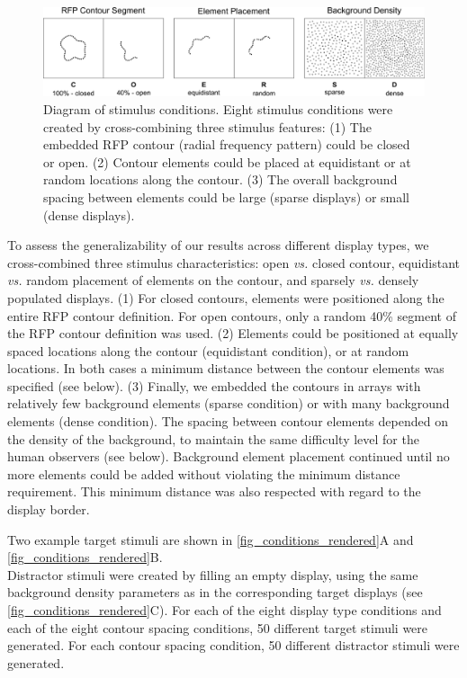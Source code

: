 \documentclass[12pt]{article}
\begin{document}
\begin{figure}[ht]
\includegraphics{Figures/FIG_conditions.png}
\caption{Diagram of stimulus conditions. Eight stimulus conditions were created by cross-combining three stimulus features: (1) The embedded RFP contour (radial frequency pattern) could be closed or open. (2) Contour elements could be placed at equidistant or at random locations along the contour. (3) The overall background spacing between elements could be large (sparse displays) or small (dense displays).}
\label{fig_conditions}
\end{figure}

To assess the generalizability of our results across different  display types, we cross-combined three stimulus characteristics: open \emph{vs.} closed contour, equidistant \emph{vs.} random placement of elements on the contour, and sparsely \emph{vs.} densely populated displays. (1) For closed contours, elements were positioned along the entire RFP contour definition. For open contours, only a random 40\% segment of the RFP contour definition was used. (2) Elements could be positioned at equally spaced locations along the contour (equidistant condition), or at random locations. In both cases a minimum distance between the contour elements was specified (see below). (3) Finally, we embedded the contours in arrays with relatively few background elements (sparse condition) or with many background elements (dense condition). The spacing between contour elements depended on the density of the background, to maintain the same difficulty level for the human observers (see below). Background element placement continued until no more elements could be added without violating the minimum distance requirement. This minimum distance was also respected  with regard to the display border. 

Two example target stimuli are shown in \autoref{fig_conditions_rendered}A and \autoref{fig_conditions_rendered}B.\\

Distractor stimuli were created by filling an empty display, using the same background density parameters as in the corresponding target displays (see \autoref{fig_conditions_rendered}C). For each of the eight display type conditions and each of the eight contour spacing conditions, 50 different target stimuli were generated. For each contour spacing condition, 50 different distractor stimuli were generated.\\
\end{document}
